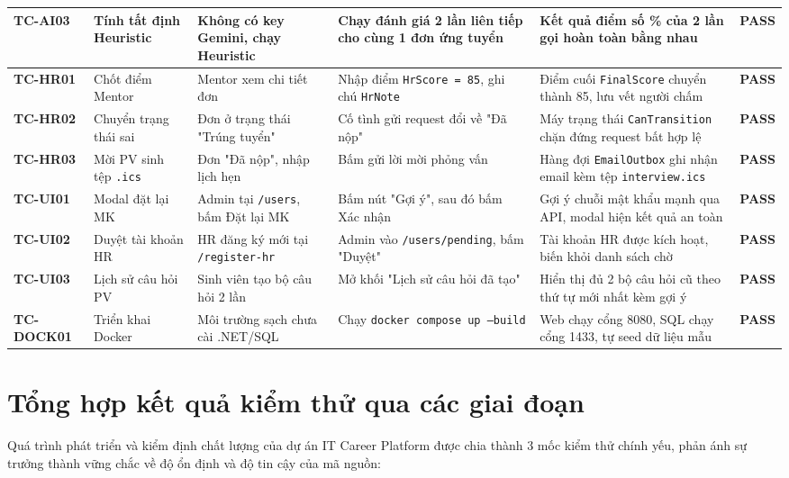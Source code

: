 {\begin{longtable}{p{1.6cm} p{2.2cm} p{2.7cm} p{3.4cm} p{3.4cm} c}
\addlinespace
\textbf{TC-AI03} & Tính tất định Heuristic & Không có key Gemini, chạy Heuristic & Chạy đánh giá 2 lần liên tiếp cho cùng 1 đơn ứng tuyển & Kết quả điểm số \% của 2 lần gọi hoàn toàn bằng nhau & \textbf{PASS} \\
\midrule
\textbf{TC-HR01} & Chốt điểm Mentor & Mentor xem chi tiết đơn & Nhập điểm \texttt{HrScore = 85}, ghi chú \texttt{HrNote} & Điểm cuối \texttt{FinalScore} chuyển thành 85, lưu vết người chấm & \textbf{PASS} \\
\addlinespace
\textbf{TC-HR02} & Chuyển trạng thái sai & Đơn ở trạng thái "Trúng tuyển" & Cố tình gửi request đổi về "Đã nộp" & Máy trạng thái \texttt{CanTransition} chặn đứng request bất hợp lệ & \textbf{PASS} \\
\addlinespace
\textbf{TC-HR03} & Mời PV sinh tệp \texttt{.ics} & Đơn "Đã nộp", nhập lịch hẹn & Bấm gửi lời mời phỏng vấn & Hàng đợi \texttt{EmailOutbox} ghi nhận email kèm tệp \texttt{interview.ics} & \textbf{PASS} \\
\midrule
\textbf{TC-UI01} & Modal đặt lại MK & Admin tại \texttt{/users}, bấm Đặt lại MK & Bấm nút "Gợi ý", sau đó bấm Xác nhận & Gợi ý chuỗi mật khẩu mạnh qua API, modal hiện kết quả an toàn & \textbf{PASS} \\
\addlinespace
\textbf{TC-UI02} & Duyệt tài khoản HR & HR đăng ký mới tại \texttt{/register-hr} & Admin vào \texttt{/users/pending}, bấm "Duyệt" & Tài khoản HR được kích hoạt, biến khỏi danh sách chờ & \textbf{PASS} \\
\addlinespace
\textbf{TC-UI03} & Lịch sử câu hỏi PV & Sinh viên tạo bộ câu hỏi 2 lần & Mở khối "Lịch sử câu hỏi đã tạo" & Hiển thị đủ 2 bộ câu hỏi cũ theo thứ tự mới nhất kèm gợi ý & \textbf{PASS} \\
\midrule
\textbf{TC-DOCK01} & Triển khai Docker & Môi trường sạch chưa cài .NET/SQL & Chạy \texttt{docker compose up --build} & Web chạy cổng 8080, SQL chạy cổng 1433, tự seed dữ liệu mẫu & \textbf{PASS} \\
\end{longtable}
}

\section{Tổng hợp kết quả kiểm thử qua các giai đoạn}
\label{sec:tong-hop-ket-qua}

Quá trình phát triển và kiểm định chất lượng của dự án IT Career Platform được chia thành 3 mốc kiểm thử chính yếu, phản ánh sự trưởng thành vững chắc về độ ổn định và độ tin cậy của mã nguồn:


